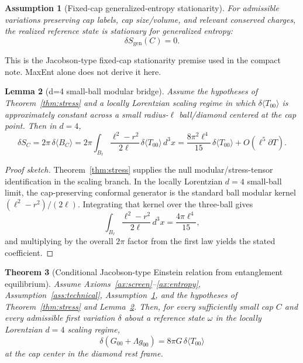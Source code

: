 \documentclass[11pt]{article}
\newtheorem{theorem}{Theorem}[section]
\newtheorem{lemma}[theorem]{Lemma}
\newtheorem{assumption}[theorem]{Assumption}
\begin{document}
\begin{assumption}[Fixed-cap generalized-entropy stationarity]\label{ass:equilibrium}
For admissible variations preserving cap labels, cap size/volume, and relevant conserved charges, the realized reference state is stationary for generalized entropy:
\[
\delta S_{\mathrm{gen}}(C)=0.
\]
\end{assumption}

This is the Jacobson-type fixed-cap stationarity premise used in the compact note. MaxEnt alone does not derive it here.

\begin{lemma}[d=4 small-ball modular bridge]\label{lem:smallball}
Assume the hypotheses of Theorem~\ref{thm:stress} and a locally Lorentzian scaling regime in which $\delta\langle T_{00}\rangle$ is approximately constant across a small radius-$\ell$ ball/diamond centered at the cap point. Then in $d=4$,
\[
\delta S_C
=
2\pi\,\delta\langle B_C\rangle
=
2\pi\int_{B_\ell}\frac{\ell^2-r^2}{2\ell}\,\delta\langle T_{00}\rangle\,d^3x
=
\frac{8\pi^2\ell^4}{15}\,\delta\langle T_{00}\rangle
+O(\ell^5\partial T).
\]
\end{lemma}

\begin{proof}[Proof sketch]
Theorem~\ref{thm:stress} supplies the null modular/stress-tensor identification in the scaling branch. In the locally Lorentzian $d=4$ small-ball limit, the cap-preserving conformal generator is the standard ball modular kernel $(\ell^2-r^2)/(2\ell)$. Integrating that kernel over the three-ball gives
\[
\int_{B_\ell}\frac{\ell^2-r^2}{2\ell}\,d^3x=\frac{4\pi\ell^4}{15},
\]
and multiplying by the overall $2\pi$ factor from the first law yields the stated coefficient.
\end{proof}

\begin{theorem}[Conditional Jacobson-type Einstein relation from entanglement equilibrium]\label{thm:einstein}
Assume Axioms~\ref{ax:screen}--\ref{ax:entropy}, Assumption~\ref{ass:technical}, Assumption~\ref{ass:equilibrium}, and the hypotheses of Theorem~\ref{thm:stress} and Lemma~\ref{lem:smallball}. Then, for every sufficiently small cap $C$ and every admissible first variation $\delta$ about a reference state $\omega$ in the locally Lorentzian $d=4$ scaling regime,
\[
\delta\!\left(G_{00}+\Lambda g_{00}\right)=8\pi G\,\delta\langle T_{00}\rangle
\]
at the cap center in the diamond rest frame.
\end{theorem}
\end{document}
